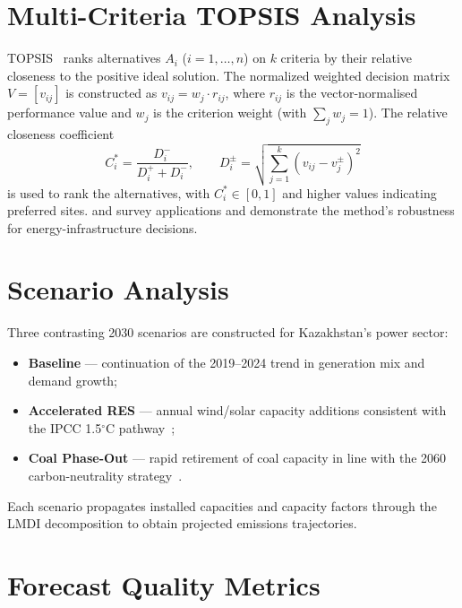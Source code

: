 \section{Multi-Criteria TOPSIS Analysis}
\label{sec:method_topsis}

TOPSIS~\cite{hwang1981} ranks alternatives $A_i$ ($i=1,\ldots,n$) on $k$ criteria by their relative closeness to the positive ideal solution. The normalized weighted decision matrix $V = [v_{ij}]$ is constructed as $v_{ij} = w_j \cdot r_{ij}$, where $r_{ij}$ is the vector-normalised performance value and $w_j$ is the criterion weight (with $\sum_j w_j = 1$). The relative closeness coefficient
\begin{equation}
    C_i^* = \frac{D_i^-}{D_i^+ + D_i^-}, \qquad
    D_i^\pm = \sqrt{\sum_{j=1}^k (v_{ij} - v_j^\pm)^2}
\end{equation}
is used to rank the alternatives, with $C_i^* \in [0, 1]$ and higher values indicating preferred sites. \cite{mardani2017} and \cite{behzadian2012} survey applications and demonstrate the method's robustness for energy-infrastructure decisions.

\section{Scenario Analysis}
\label{sec:method_scenarios}

Three contrasting 2030 scenarios are constructed for Kazakhstan's power sector:
\begin{itemize}
    \item \textbf{Baseline} --- continuation of the 2019--2024 trend in generation mix and demand growth;
    \item \textbf{Accelerated RES} --- annual wind/solar capacity additions consistent with the IPCC 1.5$^\circ$C pathway~\cite{rogelj2018};
    \item \textbf{Coal Phase-Out} --- rapid retirement of coal capacity in line with the 2060 carbon-neutrality strategy~\cite{moe2023strategy}.
\end{itemize}
Each scenario propagates installed capacities and capacity factors through the LMDI decomposition to obtain projected emissions trajectories.

\section{Forecast Quality Metrics}
\label{sec:method_metrics}

